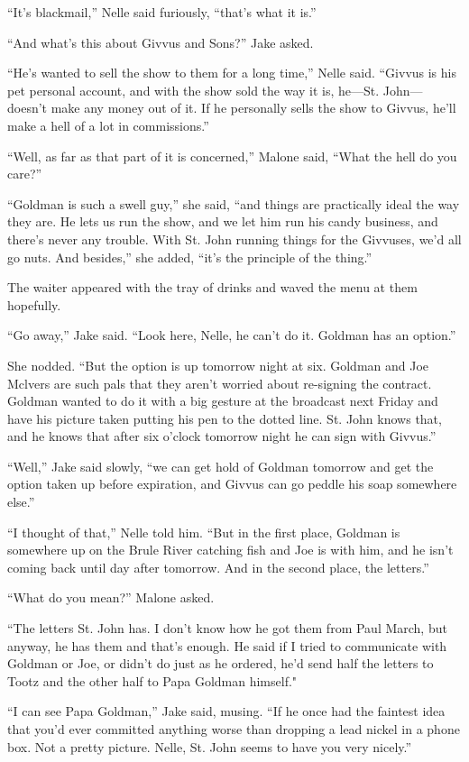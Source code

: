 \documentclass{novel}
\begin{document}
“It’s blackmail,” Nelle said furiously, “that’s what it is.”

“And what’s this about Givvus and Sons?” Jake asked.

“He’s wanted to sell the show to them for a long time,” Nelle said. “Givvus is his pet personal account, and with the show sold the way it is, he—St. John— doesn’t make any money out of it. If he personally sells the show to Givvus, he’ll make a hell of a lot in commissions.”

“Well, as far as that part of it is concerned,” Malone said, “What the hell do you care?”

“Goldman is such a swell guy,” she said, “and things are practically ideal the way they are. He lets us run the show, and we let him run his candy business, and there’s never any trouble. With St. John running things for the Givvuses, we’d all go nuts. And besides,” she added, “it’s the principle of the thing.”

The waiter appeared with the tray of drinks and waved the menu at them hopefully.

“Go away,” Jake said. “Look here, Nelle, he can’t do it. Goldman has an option.”

She nodded. “But the option is up tomorrow night at six. Goldman and Joe Mclvers are such pals that they aren’t worried about re-signing the contract. Goldman wanted to do it with a big gesture at the broadcast next Friday and have his picture taken putting his pen to the dotted line. St. John knows that, and he knows that after six o’clock tomorrow night he can sign with Givvus.”

“Well,” Jake said slowly, “we can get hold of Goldman tomorrow and get the option taken up before expiration, and Givvus can go peddle his soap somewhere else.”

“I thought of that,” Nelle told him. “But in the first place, Goldman is somewhere up on the Brule River catching fish and Joe is with him, and he isn’t coming back until day after tomorrow. And in the second place, the letters.”

“What do you mean?” Malone asked.

“The letters St. John has. I don’t know how he got them from Paul March, but anyway, he has them and that’s enough. He said if I tried to communicate with Goldman or Joe, or didn’t do just as he ordered, he’d send half the letters to Tootz and the other half to Papa Goldman himself."

“I can see Papa Goldman,” Jake said, musing. “If he once had the faintest idea that you’d ever committed anything worse than dropping a lead nickel in a phone box. Not a pretty picture. Nelle, St. John seems to have you very nicely.”
\end{document}
